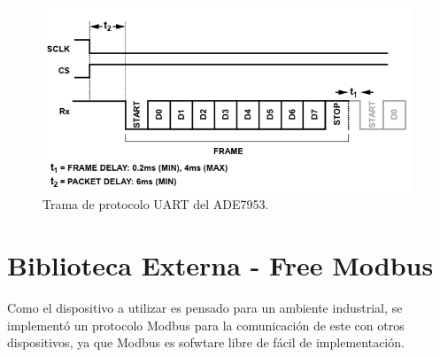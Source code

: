 \begin{figure}[h]
	\centering
	\includegraphics[width=110mm,keepaspectratio]{Figures/tramauartade.png}
	\caption{Trama de protocolo UART del ADE7953.}
	\label{fig:UARTADE7953}
\end{figure}








\section{ Biblioteca Externa - Free Modbus}
\label{sec:cap2parte6}

Como el dispositivo a utilizar es pensado para un ambiente industrial, se implementó un protocolo Modbus para la comunicación de este con otros dispositivos, ya que Modbus es sofwtare libre de fácil de implementación.


